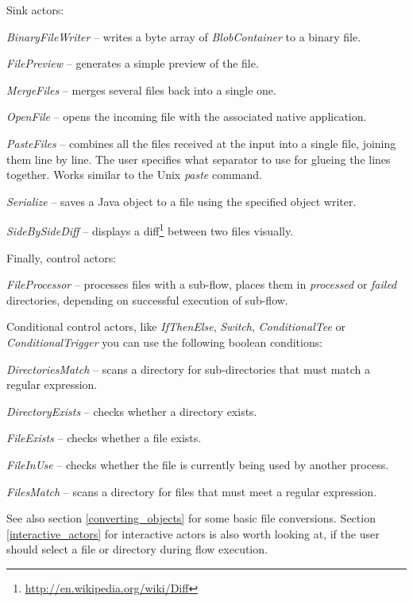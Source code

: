 Sink actors:
\begin{tight_itemize}
	\item \textit{BinaryFileWriter} -- writes a byte array of 
	\textit{BlobContainer} to a binary file.
	\item \textit{FilePreview} -- generates a simple preview of the file.
	\item \textit{MergeFiles} -- merges several files back into a single one.
	\item \textit{OpenFile} -- opens the incoming file with the associated
	native application.
	\item \textit{PasteFiles} -- combines all the files received at the input into
	a single file, joining them line by line. The user specifies what separator to
	use for glueing the lines together. Works similar to the Unix \textit{paste}
	command.
	\item \textit{Serialize} -- saves a Java object to a file using the specified object writer.
	\item \textit{SideBySideDiff} -- displays a diff\footnote{\url{http://en.wikipedia.org/wiki/Diff}{}} 
	between two files visually.
\end{tight_itemize}
Finally, control actors:
\begin{tight_itemize}
	\item \textit{FileProcessor} -- processes files with a sub-flow, places
	them in \textit{processed} or \textit{failed} directories, depending on
	successful execution of sub-flow.
\end{tight_itemize}
Conditional control actors, like \textit{IfThenElse}, \textit{Switch}, 
\textit{ConditionalTee} or \textit{ConditionalTrigger} you can use the following
boolean conditions:
\begin{tight_itemize}
	\item \textit{DirectoriesMatch} -- scans a directory for sub-directories 
	that must match a regular expression.
	\item \textit{DirectoryExists} -- checks whether a directory exists.
	\item \textit{FileExists} -- checks whether a file exists.
	\item \textit{FileInUse} -- checks whether the file is currently being
	used by another process.
	\item \textit{FilesMatch} -- scans a directory for files that must meet
	a regular expression.
\end{tight_itemize}
See also section \ref{converting_objects} for some basic file conversions.
Section \ref{interactive_actors} for interactive actors is also worth looking
at, if the user should select a file or directory during flow execution.

